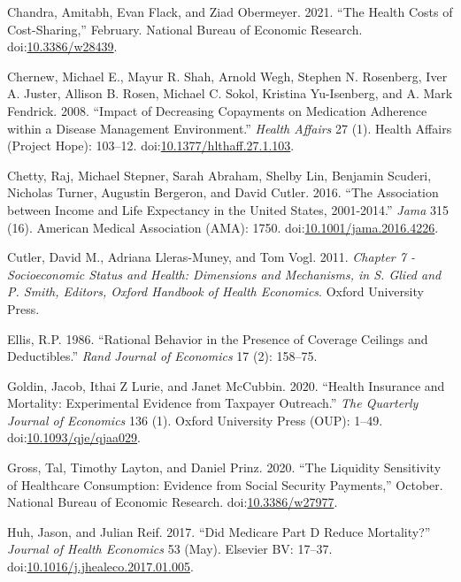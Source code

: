 \documentclass[a4paper,12pt]{article}
\begin{document}
\hypertarget{citeproc_bib_item_6}{Chandra, Amitabh, Evan Flack, and Ziad Obermeyer. 2021. “The Health Costs of Cost-Sharing,” February. National Bureau of Economic Research. doi:\href{https://doi.org/10.3386/w28439}{10.3386/w28439}.}

\hypertarget{citeproc_bib_item_7}{Chernew, Michael E., Mayur R. Shah, Arnold Wegh, Stephen N. Rosenberg, Iver A. Juster, Allison B. Rosen, Michael C. Sokol, Kristina Yu-Isenberg, and A. Mark Fendrick. 2008. “Impact of Decreasing Copayments on Medication Adherence within a Disease Management Environment.” \textit{Health Affairs} 27 (1). Health Affairs (Project Hope): 103–12. doi:\href{https://doi.org/10.1377/hlthaff.27.1.103}{10.1377/hlthaff.27.1.103}.}

\hypertarget{citeproc_bib_item_8}{Chetty, Raj, Michael Stepner, Sarah Abraham, Shelby Lin, Benjamin Scuderi, Nicholas Turner, Augustin Bergeron, and David Cutler. 2016. “The Association between Income and Life Expectancy in the United States, 2001-2014.” \textit{Jama} 315 (16). American Medical Association (AMA): 1750. doi:\href{https://doi.org/10.1001/jama.2016.4226}{10.1001/jama.2016.4226}.}

\hypertarget{citeproc_bib_item_9}{Cutler, David M., Adriana Lleras-Muney, and Tom Vogl. 2011. \textit{Chapter 7 - Socioeconomic Status and Health: Dimensions and Mechanisms, in S. Glied and P. Smith, Editors, Oxford Handbook of Health Economics}. Oxford University Press.}

\hypertarget{citeproc_bib_item_10}{Ellis, R.P. 1986. “Rational Behavior in the Presence of Coverage Ceilings and Deductibles.” \textit{Rand Journal of Economics} 17 (2): 158–75.}

\hypertarget{citeproc_bib_item_11}{Goldin, Jacob, Ithai Z Lurie, and Janet McCubbin. 2020. “Health Insurance and Mortality: Experimental Evidence from Taxpayer Outreach.” \textit{The Quarterly Journal of Economics} 136 (1). Oxford University Press (OUP): 1–49. doi:\href{https://doi.org/10.1093/qje/qjaa029}{10.1093/qje/qjaa029}.}

\hypertarget{citeproc_bib_item_12}{Gross, Tal, Timothy Layton, and Daniel Prinz. 2020. “The Liquidity Sensitivity of Healthcare Consumption: Evidence from Social Security Payments,” October. National Bureau of Economic Research. doi:\href{https://doi.org/10.3386/w27977}{10.3386/w27977}.}

\hypertarget{citeproc_bib_item_13}{Huh, Jason, and Julian Reif. 2017. “Did Medicare Part D Reduce Mortality?” \textit{Journal of Health Economics} 53 (May). Elsevier BV: 17–37. doi:\href{https://doi.org/10.1016/j.jhealeco.2017.01.005}{10.1016/j.jhealeco.2017.01.005}.}
\end{document}
